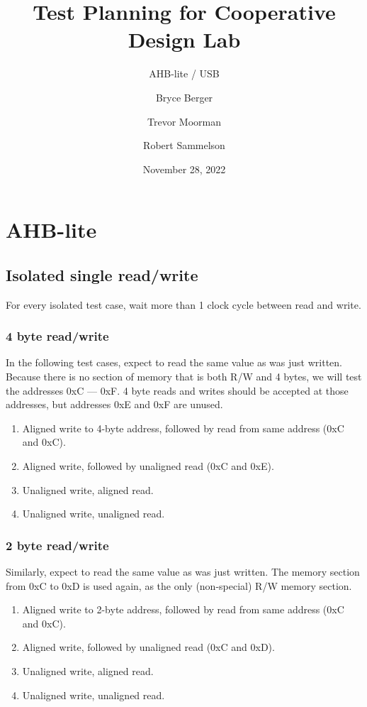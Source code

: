 \documentclass{scrartcl}
\title{Test Planning for Cooperative Design Lab}
\subtitle{AHB-lite / USB}
\author{ Bryce Berger \and Trevor Moorman \and Robert Sammelson }
\date{November 28, 2022}
\begin{document}
\maketitle
\tableofcontents
\newpage


\section{AHB-lite}

\subsection{Isolated single read/write}

For every isolated test case, wait more than 1 clock cycle between read and write.

\subsubsection{4 byte read/write}
\label{s4brr}
In the following test cases, expect to read the same value as was just written. Because there is no section of memory that is both R/W and 4 bytes, we will test the addresses 0xC --- 0xF. 4 byte reads and writes should be accepted at those addresses, but addresses 0xE and 0xF are unused.
\begin{enumerate}
    \item Aligned write to 4-byte address, followed by read from same address (0xC and 0xC).
    \item Aligned write, followed by unaligned read (0xC and 0xE).
    \item Unaligned write, aligned read.
    \item Unaligned write, unaligned read.
\end{enumerate}

\subsubsection{2 byte read/write}
\label{s2brr}
Similarly, expect to read the same value as was just written. The memory section from 0xC to 0xD is used again, as the only (non-special) R/W memory section.
\begin{enumerate}
    \item Aligned write to 2-byte address, followed by read from same address (0xC and 0xC).
    \item Aligned write, followed by unaligned read (0xC and 0xD).
    \item Unaligned write, aligned read.
    \item Unaligned write, unaligned read.
\end{enumerate}
\end{document}
